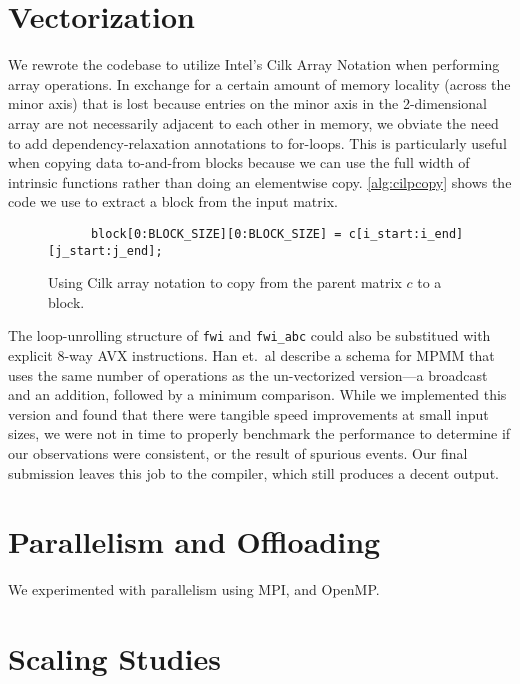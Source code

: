 \documentclass{scrartcl}
\begin{document}
  \section{Vectorization}
  We rewrote the codebase to utilize Intel's Cilk Array Notation when performing array operations. In exchange for a certain amount of memory locality (across the minor axis) that is lost because entries on the minor axis in the 2-dimensional array are not necessarily adjacent to each other in memory, we obviate the need to add dependency-relaxation annotations to for-loops. This is particularly useful when copying data to-and-from blocks because we can use the full width of intrinsic functions rather than doing an elementwise copy. \autoref{alg:cilpcopy} shows the code we use to extract a block from the input matrix.

  \begin{figure}[ht!]
    \begin{lstlisting}
      block[0:BLOCK_SIZE][0:BLOCK_SIZE] = c[i_start:i_end][j_start:j_end];
    \end{lstlisting}
    \caption{Using Cilk array notation to copy from the parent matrix $c$ to a block.\label{alg:cilkcopy}}
  \end{figure}

  The loop-unrolling structure of \texttt{fwi} and \texttt{fwi\_abc} could also be substitued with explicit 8-way AVX instructions. Han et.~al describe a schema for MPMM that uses the same number of operations as the un-vectorized version---a broadcast and an addition, followed by a minimum comparison. While we implemented this version and found that there were tangible speed improvements at small input sizes, we were not in time to properly benchmark the performance to determine if our observations were consistent, or the result of spurious events. Our final submission leaves this job to the compiler, which still produces a decent output.
  \section{Parallelism and Offloading}
  We experimented with parallelism using MPI, and OpenMP\@.
  \section{Scaling Studies}
\end{document}
